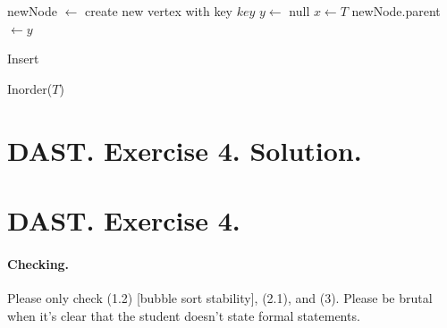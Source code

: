 \begin{algorithm}
\SetAlgoLined
{}
    newNode $\leftarrow$ create new vertex with key $key$\;
    $y \leftarrow$ null\;
    $x \leftarrow T$\;
    newNode.parent $\leftarrow y$\;
\caption{Insert}
\end{algorithm}

%
\begin{algorithm}
\SetAlgoLined
{}
\caption{Inorder($T$)}
\end{algorithm}






%


 



\setcounter{chapter}{4}
\ifdefined\SOLUTION
  \section{DAST. Exercise 4. Solution.}
\else
  \section{DAST. Exercise 4.}
\fi

\ifdefined\CHECK


  \paragraph{Checking.} Please only check (1.2) [bubble sort stability], (2.1), and (3). Please be brutal when it's clear that the student doesn't state formal statements.
\paragraph{}

